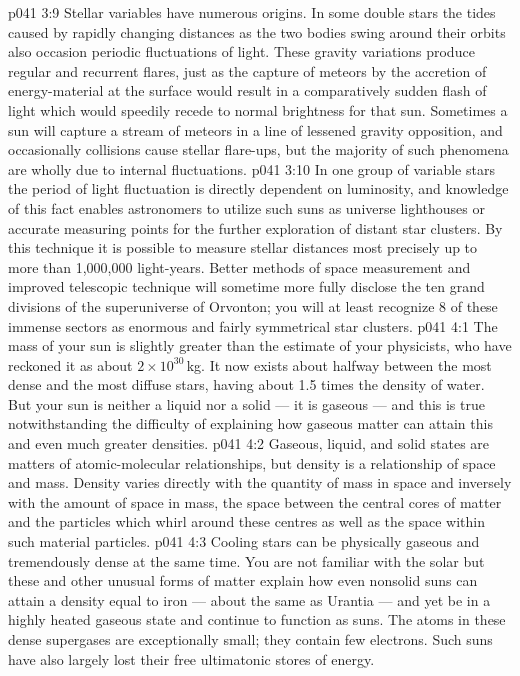 \vs p041 3:9 Stellar variables have numerous origins. In some double stars the tides caused by rapidly changing distances as the two bodies swing around their orbits also occasion periodic fluctuations of light. These gravity variations produce regular and recurrent flares, just as the capture of meteors by the accretion of energy\hyp{}material at the surface would result in a comparatively sudden flash of light which would speedily recede to normal brightness for that sun. Sometimes a sun will capture a stream of meteors in a line of lessened gravity opposition, and occasionally collisions cause stellar flare\hyp{}ups, but the majority of such phenomena are wholly due to internal fluctuations.
\vs p041 3:10 In one group of variable stars the period of light fluctuation is directly dependent on luminosity, and knowledge of this fact enables astronomers to utilize such suns as universe lighthouses or accurate measuring points for the further exploration of distant star clusters. By this technique it is possible to measure stellar distances most precisely up to more than 1,000,000 light\hyp{}years. Better methods of space measurement and improved telescopic technique will sometime more fully disclose the ten grand divisions of the superuniverse of Orvonton; you will at least recognize 8 of these immense sectors as enormous and fairly symmetrical star clusters.
\vs p041 4:1 The mass of your sun is slightly greater than the estimate of your physicists, who have reckoned it as about $2\times 10^{30}$\,kg. It now exists about halfway between the most dense and the most diffuse stars, having about 1.5 times the density of water. But your sun is neither a liquid nor a solid --- it is gaseous --- and this is true notwithstanding the difficulty of explaining how gaseous matter can attain this and even much greater densities.
\vs p041 4:2 \pc Gaseous, liquid, and solid states are matters of atomic\hyp{}molecular relationships, but density is a relationship of space and mass. Density varies directly with the quantity of mass in space and inversely with the amount of space in mass, the space between the central cores of matter and the particles which whirl around these centres as well as the space within such material particles.
\vs p041 4:3 \pc Cooling stars can be physically gaseous and tremendously dense at the same time. You are not familiar with the solar  but these and other unusual forms of matter explain how even nonsolid suns can attain a density equal to iron --- about the same as Urantia --- and yet be in a highly heated gaseous state and continue to function as suns. The atoms in these dense supergases are exceptionally small; they contain few electrons. Such suns have also largely lost their free ultimatonic stores of energy.
